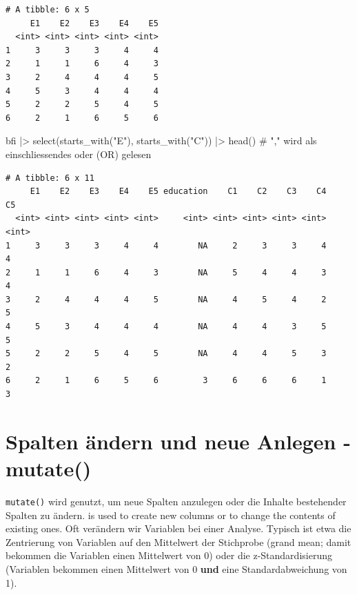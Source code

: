 \documentclass[
  letterpaper,
  DIV=11,
  numbers=noendperiod]{scrreprt}
\newenvironment{Shaded}{\begin{snugshade}}{\end{snugshade}}
\newcommand{\CommentTok}[1]{\textcolor[rgb]{0.37,0.37,0.37}{#1}}
\newcommand{\FunctionTok}[1]{\textcolor[rgb]{0.28,0.35,0.67}{#1}}
\newcommand{\NormalTok}[1]{\textcolor[rgb]{0.00,0.23,0.31}{#1}}
\newcommand{\SpecialCharTok}[1]{\textcolor[rgb]{0.37,0.37,0.37}{#1}}
\newcommand{\StringTok}[1]{\textcolor[rgb]{0.13,0.47,0.30}{#1}}
\begin{document}
\begin{verbatim}
# A tibble: 6 x 5
     E1    E2    E3    E4    E5
  <int> <int> <int> <int> <int>
1     3     3     3     4     4
2     1     1     6     4     3
3     2     4     4     4     5
4     5     3     4     4     4
5     2     2     5     4     5
6     2     1     6     5     6
\end{verbatim}

\begin{Shaded}
\begin{Highlighting}[]
\NormalTok{bfi }\SpecialCharTok{|\textgreater{}} \FunctionTok{select}\NormalTok{(}\FunctionTok{starts\_with}\NormalTok{(}\StringTok{"E"}\NormalTok{), }\FunctionTok{starts\_with}\NormalTok{(}\StringTok{"C"}\NormalTok{)) }\SpecialCharTok{|\textgreater{}} \FunctionTok{head}\NormalTok{() }\CommentTok{\# "," wird als einschliessendes oder (OR) gelesen}
\end{Highlighting}
\end{Shaded}

\begin{verbatim}
# A tibble: 6 x 11
     E1    E2    E3    E4    E5 education    C1    C2    C3    C4    C5
  <int> <int> <int> <int> <int>     <int> <int> <int> <int> <int> <int>
1     3     3     3     4     4        NA     2     3     3     4     4
2     1     1     6     4     3        NA     5     4     4     3     4
3     2     4     4     4     5        NA     4     5     4     2     5
4     5     3     4     4     4        NA     4     4     3     5     5
5     2     2     5     4     5        NA     4     4     5     3     2
6     2     1     6     5     6         3     6     6     6     1     3
\end{verbatim}

\section{Spalten ändern und neue Anlegen -
mutate()}\label{spalten-uxe4ndern-und-neue-anlegen---mutate}

\texttt{mutate()} wird genutzt, um neue Spalten anzulegen oder die
Inhalte bestehender Spalten zu ändern. is used to create new columns or
to change the contents of existing ones. Oft verändern wir Variablen bei
einer Analyse. Typisch ist etwa die Zentrierung von Variablen auf den
Mittelwert der Stichprobe (grand mean; damit bekommen die Variablen
einen Mittelwert von 0) oder die z-Standardisierung (Variablen bekommen
einen Mittelwert von 0 \textbf{und} eine Standardabweichung von 1).
\end{document}
